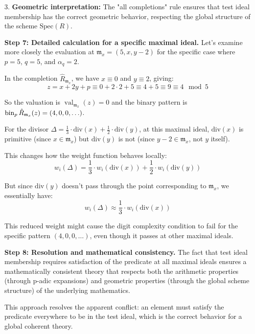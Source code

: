 \begin{example}
3. \textbf{Geometric interpretation:} The "all completions" rule ensures that test ideal membership has the correct geometric behavior, respecting the global structure of the scheme $\text{Spec}(R)$.

\textbf{Step 7: Detailed calculation for a specific maximal ideal.} Let's examine more closely the evaluation at $\mathfrak{m}_x = (5, x, y-2)$ for the specific case where $p = 5$, $q = 5$, and $\alpha_q = 2$.

In the completion $\hat{R}_{\mathfrak{m}_x}$, we have $x \equiv 0$ and $y \equiv 2$, giving:
$$z = x + 2y + p \equiv 0 + 2 \cdot 2 + 5 \equiv 4 + 5 \equiv 9 \equiv 4 \mod 5$$

So the valuation is $\operatorname{val}_{\mathfrak{m}_x}(z) = 0$ and the binary pattern is $\operatorname{bin}_p{\hat{R}_{\mathfrak{m}_x}}(z) = (4, 0, 0, \ldots)$.

For the divisor $\Delta = \frac{1}{3} \cdot \text{div}(x) + \frac{1}{2} \cdot \text{div}(y)$, at this maximal ideal, $\text{div}(x)$ is primitive (since $x \in \mathfrak{m}_x$) but $\text{div}(y)$ is not (since $y - 2 \in \mathfrak{m}_x$, not $y$ itself).

This changes how the weight function behaves locally:
$$w_i(\Delta) = \frac{1}{3} \cdot w_i(\text{div}(x)) + \frac{1}{2} \cdot w_i(\text{div}(y))$$

But since $\text{div}(y)$ doesn't pass through the point corresponding to $\mathfrak{m}_x$, we essentially have:
$$w_i(\Delta) \approx \frac{1}{3} \cdot w_i(\text{div}(x))$$

This reduced weight might cause the digit complexity condition to fail for the specific pattern $(4, 0, 0, \ldots)$, even though it passes at other maximal ideals.

\textbf{Step 8: Resolution and mathematical consistency.} The fact that test ideal membership requires satisfaction of the predicate at all maximal ideals ensures a mathematically consistent theory that respects both the arithmetic properties (through p-adic expansions) and geometric properties (through the global scheme structure) of the underlying mathematics.

This approach resolves the apparent conflict: an element must satisfy the predicate everywhere to be in the test ideal, which is the correct behavior for a global coherent theory.
\end{example}

